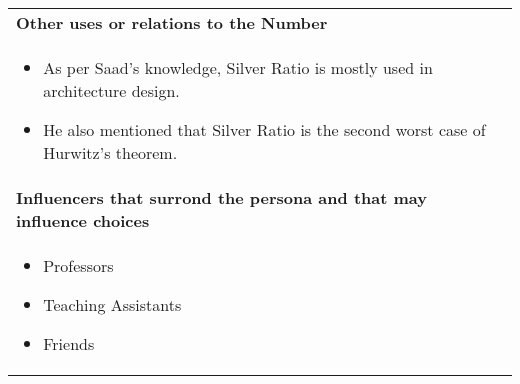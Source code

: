 \documentclass[12pt]{article}
\begin{document}
\begin{center}
\begin{tabular}{ | m{40em} | }
\hline
\textbf{Other uses or relations to the Number} \\
\begin{itemize}
\item As per Saad's knowledge, Silver Ratio is mostly used in architecture design.
\item He also mentioned that Silver Ratio is the second worst case of Hurwitz's theorem. 
\end{itemize}
\\
\hline
\textbf{Influencers that surrond the persona and that may influence choices} \\
\begin{itemize}
\item Professors
\item Teaching Assistants
\item Friends
\end{itemize}
\\
\hline
\end{tabular}
\end{center}





\vspace{\baselineskip}

\printbibliography
\end{document}
